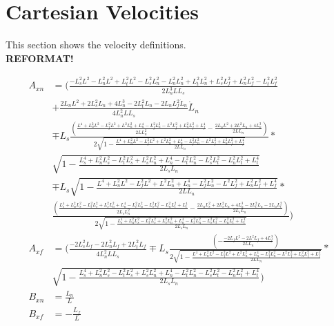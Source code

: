 \documentclass[11pt, landscape]{article}
\begin{document}
\section{Cartesian Velocities}
This section shows the velocity definitions. \\

\textbf{REFORMAT!}

\begin{align}
  A_{xn} &= \Bigg(\frac{-L_s^2L^2 - L_n^2L^2 + L_t^2L^2 - L_s^2L_{n}^2 - L_n^2L_{n}^2 + L_t^2L_{n}^2 + L_s^2L_{f}^2 + L_n^2L_{f}^2 - L_t^2L_{f}^2}{{2L_n^{3}LL_s}}\\
  &+ \frac{2L_nL^2 + 2L_s^2L_{n} + 4L_n^3 - 2L_t^2L_{n} - 2L_nL_{f}^2\dot{L}_n}{4L_n^2LL_s}\dot{L}_n\\
  &\mp L_s\frac{\left(\frac{L^4 + L_n^2L^2 - L_f^2L^2 + L^2L_{n}^2 + L_{n}^4 - L_f^2L_{n}^2 - L^2L_{f}^2 + L_n^2L_{f}^2 + L_{f}^4}{2LL^2_{n}} - \frac{2L_nL^2 + 2L^2L_{n} + 4L_{n}^3}{2LL_{n}}\right)}{2\sqrt{1-\frac{L^4 + L_n^2L^2 - L_f^2L^2 + L^2L_{n}^2 + L_{n}^4 - L_f^2L_{n}^2 - L^2L_{f}^2 + L_n^2L_{f}^2 + L_{f}^4}{2LL_{n}}}}*\\
  &\sqrt{1-\frac{L_{s}^4 + L_n^2L_{s}^2 - L_t^2L_{s}^2 + L_s^2L_{n}^2 + L_{n}^4 - L_t^2L_{n}^2 - L_s^2L_{t}^2 - L_n^2L_{t}^2 + L_{t}^4}{2L_{s}L_{n}}}\\
  &\mp L_s\sqrt{1-\frac{L^4 + L_n^2L^2 - L_f^2L^2 + L^2L_{n}^2 + L_{n}^4 - L_f^2L_{n}^2 - L^2L_{f}^2 + L_n^2L_{f}^2 + L_{f}^4}{2LL_{n}}}*\\
  &\frac{\left(\frac{L_{s}^4 + L_n^2L_{s}^2 - L_t^2L_{s}^2 + L_s^2L_{n}^2 + L_{n}^4 - L_t^2L_{n}^2 - L_s^2L_{t}^2 - L_n^2L_{t}^2 + L_{t}^4}{2L_{s}L^2_{n}}
    - \frac{2L_nL_{s}^2 + 2L_s^2L_{n} + 4L_{n}^3 - 2L_t^2L_{n} - 2L_nL_{t}^2}{2L_{s}L_{n}}\right)}{2\sqrt{1-\frac{L_{s}^4 + L_n^2L_{s}^2 - L_t^2L_{s}^2 + L_s^2L_{n}^2 + L_{n}^4 - L_t^2L_{n}^2 - L_s^2L_{t}^2 - L_n^2L_{t}^2 + L_{t}^4}{2L_{s}L_{n}}}}\Bigg)\\
  A_{xf} &= \Bigg(\frac{-2L_s^2L_{f} - 2L_n^2L_{f} + 2L_t^2L_{f}}{4L_n^2LL_s} \mp L_s\frac{\left(-\frac{-2L_fL^2 - 2L^2L_{f} + 4L_{f}^3}{2LL_{n}}\right)}{2\sqrt{1-\frac{L^4 + L_n^2L^2 - L_f^2L^2 + L^2L_{n}^2 + L_{n}^4 - L_f^2L_{n}^2 - L^2L_{f}^2 + L_n^2L_{f}^2 + L_{f}^4}{2LL_{n}}}}*\\
  &\sqrt{1-\frac{L_{s}^4 + L_n^2L_{s}^2 - L_t^2L_{s}^2 + L_s^2L_{n}^2 + L_{n}^4 - L_t^2L_{n}^2 - L_s^2L_{t}^2 - L_n^2L_{t}^2 + L_{t}^4}{2L_{s}L_{n}}}\Bigg)\\
  B_{xn} &= \frac{L_n}{L}\\
  B_{xf} &= -\frac{L_f}{L}\\

\end{align}
\end{document}
